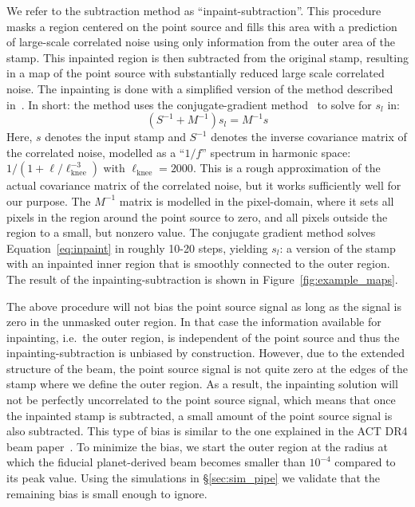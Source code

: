 We refer to the subtraction method as ``inpaint-subtraction''. This procedure masks a region centered on the point source and fills this area with a prediction of large-scale correlated noise using only information from the outer area of the stamp. This inpainted region is then subtracted from the original stamp, resulting in a map of the point source with substantially reduced large scale correlated noise. The inpainting is done with a simplified version of the method described in~\cite{bucher_2012}. In short: the method uses the conjugate-gradient method~\cite{Shewchuk_1994} to solve for $s_l$ in:
\begin{equation}\label{eq:inpaint}
\left(S^{-1} + M^{-1} \right) s_l = M^{-1} s
\end{equation}
Here, $s$ denotes the input stamp and $S^{-1}$ denotes the inverse covariance matrix of the correlated noise, modelled as a ``$1/f$'' spectrum in harmonic space: $1/ (1 + \ell / \ell_{\mathrm{knee}}^{-3})$ with $\ell_{\mathrm{knee}} = 2000$. This is a rough approximation of the actual covariance matrix of the correlated noise, but it works sufficiently well for our purpose. The $M^{-1}$ matrix is modelled in the pixel-domain, where it sets all pixels in the region around the point source to zero, and all pixels outside the region to a small, but nonzero value. The conjugate gradient method solves Equation~\ref{eq:inpaint} in roughly 10-20 steps, yielding $s_l$: a version of the stamp with an inpainted inner region that is smoothly connected to the outer region. The result of the inpainting-subtraction is shown in Figure~\ref{fig:example_maps}.

The above procedure will not bias the point source signal as long as the signal is zero in the unmasked outer region. In that case the information available for inpainting, i.e.\ the outer region, is independent of the point source and thus the inpainting-subtraction is unbiased by construction. However, due to the extended structure of the beam, the point source signal is not quite zero at the edges of the stamp where we define the outer region. As a result, the inpainting solution will not be perfectly uncorrelated to the point source signal, which means that once the inpainted stamp is subtracted, a small amount of the point source signal is also subtracted. This type of bias is similar to the one explained in the ACT DR4 beam paper~\cite{Lungu_2022}. To minimize the bias, we start the outer region at the radius at which the fiducial planet-derived beam becomes smaller than $10^{-4}$ compared to its peak value. Using the simulations in \S\ref{sec:sim_pipe} we validate that the remaining bias is small enough to ignore.
 
